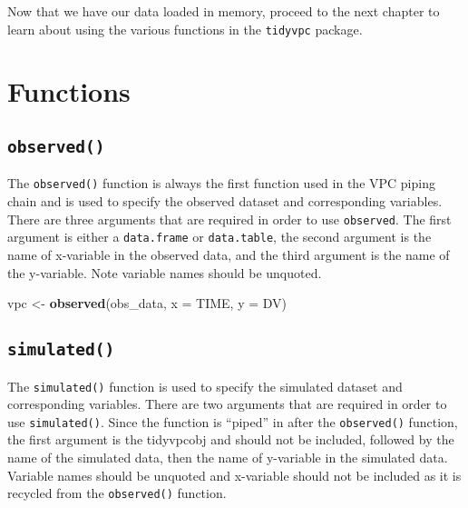 \documentclass[
]{book}
\newenvironment{Shaded}{\begin{snugshade}}{\end{snugshade}}
\newcommand{\DataTypeTok}[1]{\textcolor[rgb]{0.13,0.29,0.53}{#1}}
\newcommand{\KeywordTok}[1]{\textcolor[rgb]{0.13,0.29,0.53}{\textbf{#1}}}
\newcommand{\NormalTok}[1]{#1}
\newcommand{\OperatorTok}[1]{\textcolor[rgb]{0.81,0.36,0.00}{\textbf{#1}}}
\newcommand{\StringTok}[1]{\textcolor[rgb]{0.31,0.60,0.02}{#1}}
\begin{document}
Now that we have our data loaded in memory, proceed to the next chapter to learn about using the various functions in the \texttt{tidyvpc} package.

\hypertarget{functions}{%
\chapter{Functions}\label{functions}}

\hypertarget{observed}{%
\section{\texorpdfstring{\texttt{observed()}}{observed()}}\label{observed}}

The \texttt{observed()} function is always the first function used in the VPC piping chain and is used to specify the observed dataset and corresponding variables. There are three arguments that are required in order to use \texttt{observed}. The first argument is either a \texttt{data.frame} or \texttt{data.table}, the second argument is the name of x-variable in the observed data, and the third argument is the name of the y-variable. Note variable names should be unquoted.

\begin{Shaded}
\begin{Highlighting}[]
\NormalTok{vpc <-}\StringTok{ }\KeywordTok{observed}\NormalTok{(obs_data, }\DataTypeTok{x =}\NormalTok{ TIME, }\DataTypeTok{y =}\NormalTok{ DV)}
\end{Highlighting}
\end{Shaded}

\hypertarget{simulated}{%
\section{\texorpdfstring{\texttt{simulated()}}{simulated()}}\label{simulated}}

The \texttt{simulated()} function is used to specify the simulated dataset and corresponding variables. There are two arguments that are required in order to use \texttt{simulated()}. Since the function is ``piped'' in after the \texttt{observed()} function, the first argument is the tidyvpcobj and should not be included, followed by the name of the simulated data, then the name of y-variable in the simulated data. Variable names should be unquoted and x-variable should not be included as it is recycled from the \texttt{observed()} function.

\begin{Shaded}
\end{Shaded}
\end{document}
